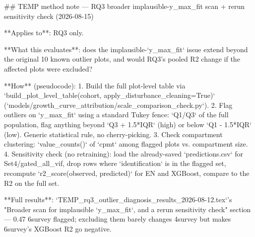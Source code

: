 ## TEMP method note — RQ3 broader implausible-y_max_fit scan + rerun sensitivity check (2026-08-15)

**Applies to**: RQ3 only.

**What this evaluates**: does the implausible-`y_max_fit` issue extend beyond the original 10
known outlier plots, and would RQ3's pooled R2 change if the affected plots were excluded?

**How** (pseudocode):
1. Build the full plot-level table via `build_plot_level_table(cohort, apply_disturbance_cleaning=True)`
   (`models/growth_curve_attribution/scale_comparison_check.py`).
2. Flag outliers on `y_max_fit` using a standard Tukey fence: `Q1/Q3` of the full population,
   flag anything beyond `Q3 + 1.5*IQR` (high) or below `Q1 - 1.5*IQR` (low). Generic statistical
   rule, no cherry-picking.
3. Check compartment clustering: `value_counts()` of `cpmt` among flagged plots vs. compartment size.
4. Sensitivity check (no retraining): load the already-saved `predictions.csv` for Set4/gated_all_vif,
   drop rows where `identification` is in the flagged set, recompute `r2_score(observed, predicted)`
   for EN and XGBoost, compare to the R2 on the full set.

**Full results**: `TEMP_rq3_outlier_diagnosis_results_2026-08-12.tex`'s "Broader scan for
implausible `y_max_fit`, and a rerun sensitivity check" section — 0.47%
6survey flagged; excluding them barely changes 4survey but makes 6survey's XGBoost R2 go negative.
